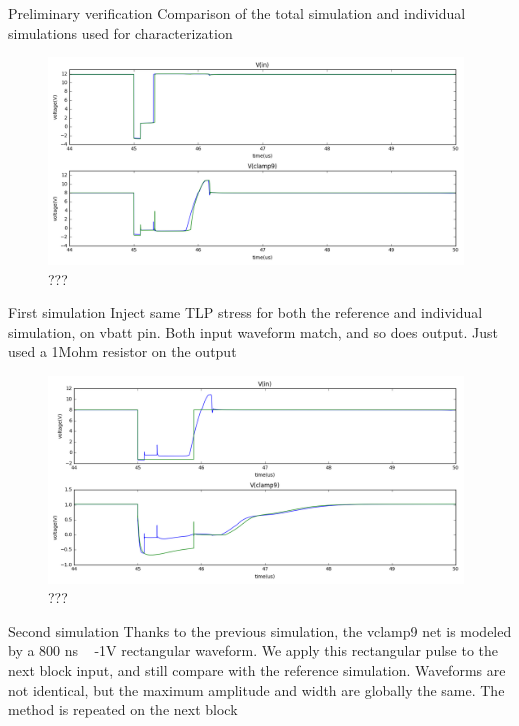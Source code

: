 Preliminary verification
Comparison of the total simulation and individual simulations used for characterization




\begin{figure}[!h]
  \centering
  \includegraphics[width=0.98\textwidth]{src/4/figures/simulation_comparison_block1.png}
  \caption{???}
  \label{fig:sim-compare-block1}
\end{figure}

First simulation
Inject same TLP stress for both the reference and individual simulation, on vbatt pin.
Both input waveform match, and so does output.
Just used a 1Mohm resistor on the output

\begin{figure}[!h]
  \centering
  \includegraphics[width=0.98\textwidth]{src/4/figures/simulation_comparison_block2.png}
  \caption{???}
  \label{fig:sim-compare-block2}
\end{figure}

Second simulation
Thanks to the previous simulation, the vclamp9 net is modeled by a 800 ns ~ -1V rectangular waveform.
We apply this rectangular pulse to the next block input, and still compare with the reference simulation.
Waveforms are not identical, but the maximum amplitude and width are globally the same.
The method is repeated on the next block

